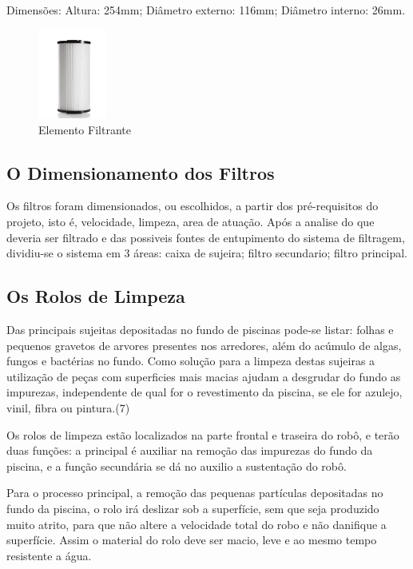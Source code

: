 \begin{description}
Dimensões: Altura: 254mm; Diâmetro externo: 116mm; Diâmetro interno: 26mm.
\par
  \begin{figure}[h]
    \centering
    \includegraphics[width=0.2\textwidth]{figures/filter.png}
    \caption{Elemento Filtrante}
    \label{fig:filter}
  \end{figure}
  \FloatBarrier
\par
\end{description}
\subsection{O Dimensionamento dos Filtros}
Os filtros foram dimensionados, ou escolhidos, a partir dos pré-requisitos do projeto, isto é, velocidade, limpeza, area de atuação. Após a analise do que deveria ser filtrado e das possiveis fontes de entupimento do sistema de filtragem, dividiu-se o sistema em 3 áreas: caixa de sujeira; filtro secundario; filtro principal.

\subsection{Os Rolos de Limpeza}
Das principais sujeitas depositadas no fundo de piscinas pode-se listar: folhas e pequenos gravetos de arvores presentes nos arredores, além do acúmulo de algas, fungos e bactérias no fundo. Como solução para a limpeza destas sujeiras a utilização de peças com superficies mais macias ajudam a desgrudar do fundo as impurezas, independente de qual for o revestimento da piscina, se ele for azulejo, vinil, fibra ou pintura.(7)

Os rolos de limpeza estão localizados na parte frontal e traseira do robô, e  terão duas funções: a principal é auxiliar na remoção das impurezas do fundo da piscina, e a função secundária se dá no auxilio a sustentação do robô. 

Para o processo principal, a remoção das pequenas partículas depositadas no fundo da piscina, o rolo irá deslizar sob a superfície, sem que seja produzido muito atrito, para que não altere a velocidade total do robo e não danifique a superfície. Assim o material do rolo deve ser macio, leve e ao mesmo tempo resistente a água.

